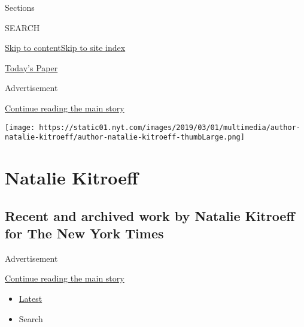 Sections

SEARCH

\protect\hyperlink{site-content}{Skip to
content}\protect\hyperlink{site-index}{Skip to site index}

\href{https://myaccount.nytimes.com/auth/login?response_type=cookie\&client_id=vi}{}

\href{https://www.nytimes.com/section/todayspaper}{Today's Paper}

Advertisement

\protect\hyperlink{after-top}{Continue reading the main story}

\texttt{[image: https://static01.nyt.com/images/2019/03/01/multimedia/author-natalie-kitroeff/author-natalie-kitroeff-thumbLarge.png]}

\hypertarget{natalie-kitroeff}{%
\section{Natalie Kitroeff}\label{natalie-kitroeff}}

\hypertarget{recent-and-archived-work-by-natalie-kitroeff-for-the-new-york-times}{%
\subsection{Recent and archived work by Natalie Kitroeff for The New
York
Times}\label{recent-and-archived-work-by-natalie-kitroeff-for-the-new-york-times}}

Advertisement

\protect\hyperlink{after-mid1}{Continue reading the main story}

\begin{itemize}
\tightlist
\item
  \protect\hyperlink{stream-panel}{Latest}
\item
  Search
\end{itemize}

